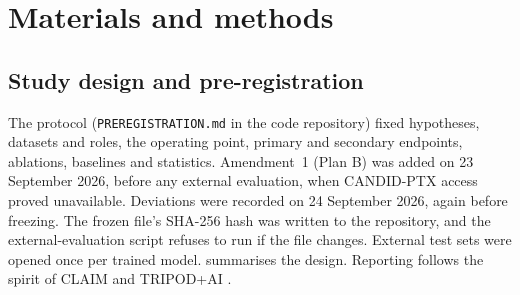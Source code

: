 \documentclass{ieeeaccess}
\begin{document}
\section{Materials and methods}
\label{sec:methods}

\subsection{Study design and pre-registration}
\label{sec:design}
The protocol (\texttt{PREREGISTRATION.md} in the code repository) fixed hypotheses, datasets and roles, the operating point, primary and secondary endpoints, ablations, baselines and statistics. Amendment~1 (Plan B) was added on 23 September 2026, before any external evaluation, when CANDID-PTX access proved unavailable. Deviations were recorded on 24 September 2026, again before freezing. The frozen file's SHA-256 hash was written to the repository, and the external-evaluation script refuses to run if the file changes. External test sets were opened once per trained model.  summarises the design. Reporting follows the spirit of CLAIM and TRIPOD+AI \cite{mongan2020claim,collins2024tripodai}.
\end{document}
